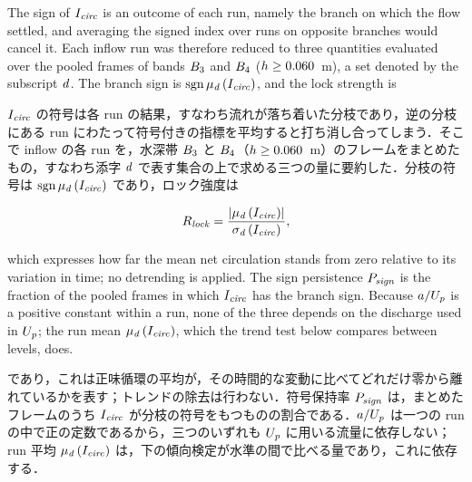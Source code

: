 \label{sec:branch}

\begin{en}[M6-1]
The sign of $I_{\mathit{circ}}$ is an outcome of each run, namely the branch on which the flow settled, and averaging the signed index over runs on opposite branches would cancel it. Each inflow run was therefore reduced to three quantities evaluated over the pooled frames of bands $B_{3}$ and $B_{4}$ ($h \ge 0.060$~m), a set denoted by the subscript $\mathit{d}$. The branch sign is $\operatorname{sgn} \mu_{\mathit{d}}\left(I_{\mathit{circ}}\right)$, and the lock strength is
\end{en}
\begin{ja}
$I_{\mathit{circ}}$ の符号は各 run の結果，すなわち流れが落ち着いた分枝であり，逆の分枝にある run にわたって符号付きの指標を平均すると打ち消し合ってしまう．そこで inflow の各 run を，水深帯 $B_{3}$ と $B_{4}$（$h \ge 0.060$~m）のフレームをまとめたもの，すなわち添字 $\mathit{d}$ で表す集合の上で求める三つの量に要約した．分枝の符号は $\operatorname{sgn} \mu_{\mathit{d}}\left(I_{\mathit{circ}}\right)$ であり，ロック強度は
\end{ja}
\begin{equation}
R_{\mathit{lock}} = \frac{\left| \mu_{\mathit{d}}\left(I_{\mathit{circ}}\right) \right|}{\sigma_{\mathit{d}}\left(I_{\mathit{circ}}\right)} ,
\label{eq:Rlock}
\end{equation}
\begin{en}
which expresses how far the mean net circulation stands from zero relative to its variation in time; no detrending is applied. The sign persistence $P_{\mathit{sign}}$ is the fraction of the pooled frames in which $I_{\mathit{circ}}$ has the branch sign. Because $a/U_{\mathit{p}}$ is a positive constant within a run, none of the three depends on the discharge used in $U_{\mathit{p}}$; the run mean $\mu_{\mathit{d}}\left(I_{\mathit{circ}}\right)$, which the trend test below compares between levels, does.
\end{en}
\begin{ja}
であり，これは正味循環の平均が，その時間的な変動に比べてどれだけ零から離れているかを表す；トレンドの除去は行わない．符号保持率 $P_{\mathit{sign}}$ は，まとめたフレームのうち $I_{\mathit{circ}}$ が分枝の符号をもつものの割合である．$a/U_{\mathit{p}}$ は一つの run の中で正の定数であるから，三つのいずれも $U_{\mathit{p}}$ に用いる流量に依存しない；run 平均 $\mu_{\mathit{d}}\left(I_{\mathit{circ}}\right)$ は，下の傾向検定が水準の間で比べる量であり，これに依存する．
\end{ja}

